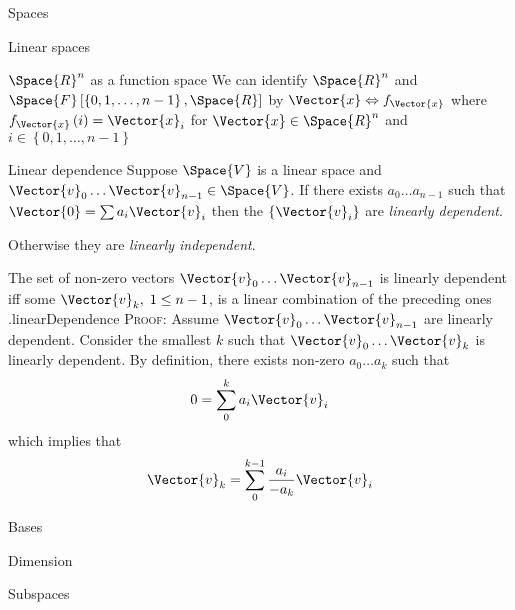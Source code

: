 \begin{plSection}{Spaces}
\begin{plSection}{Linear spaces}
\begin{plExample}{{ $\Space{R}^n$ as a function space }}{}
We can identify  
$\Space{R}^n$ and 
$ \Space{F} \left[ \left\{ 0, 1, \ldots, {n-1} \right\}, \Space{R} \right] $
by
$\Vector{x} \Leftrightarrow f_{\Vector{x}}$
where $f_{\Vector{x}} \left( i \right) = \Vector{x}_i$
for $\Vector{x} \in \Space{R}^n$ and 
$i \in \left\{ 0, 1, \ldots, {n-1} \right\}$
\end{plExample}

\begin{plDefinition}{Linear dependence}{}
Suppose $\Space{V}$ is a linear space and
$\Vector{v}_0 \ldots  \Vector{v}_{n-1} \in \Space{V}$.
If there exists $a_0 \ldots  a_{n-1}$ such that
$\Vector{0} = \sum a_i \Vector{v}_i$ then the $\left\{ \Vector{v}_i \right\}$
are \textit{linearly dependent}.

Otherwise they are \textit{linearly independent}.
\end{plDefinition}

\begin{plTheorem}{The set of non-zero vectors
 $\Vector{v}_0 \ldots \Vector{v}_{n-1}$
is linearly dependent iff some $\Vector{v}_k, \; 1 \leq n-1$, 
is a linear combination of the preceding 
ones .}{linearDependence}
\textsc{Proof:}
Assume  $\Vector{v}_0 \ldots \Vector{v}_{n-1}$ are linearly dependent.
Consider the smallest $k$ such that 
$\Vector{v}_0 \ldots \Vector{v}_{k}$ is linearly dependent.
By definition,
there exists non-zero $a_0 \ldots a_{k}$ such that
\begin{equation}
0 = \sum_0^k a_i \Vector{v}_i
\end{equation}
which implies that
\begin{equation}
\Vector{v}_k = \sum_0^{k-1} \frac{a_i}{- a_k} \Vector{v}_i
\end{equation}

\end{plTheorem}
\begin{plSection}{Bases}
\end{plSection}%
\begin{plSection}{Dimension}
\end{plSection}%
\begin{plSection}{Subspaces}


\end{plSection}
\end{plSection}
\end{plSection}
